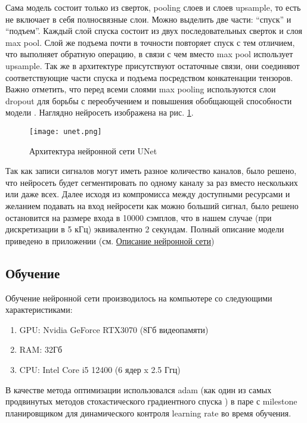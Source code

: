 Сама модель состоит только из сверток, pooling слоев и слоев upsample, то есть
не включает в себя полносвязные слои. Можно выделить две части: ``спуск'' и
``подъем''. Каждый слой спуска состоит из двух последовательных сверток и слоя
max pool. Слой же подъема почти в точности повторяет спуск с тем отличием, что
выполняет обратную операцию, в связи с чем вместо max pool использует upsample.
Так же в архитектуре присутствуют остаточные связи, они соединяют
соответствующие части спуска и подъема посредством конкатенации тензоров. Важно
отметить, что перед всеми слоями max pooling используются слои dropout для
борьбы с переобучением и повышения обобщающей способности модели
\cite{cnn-dropout}. Наглядно нейросеть изображена на рис. \ref{fig:unet}.

\begin{figure}[!htb]
	\centering
	\texttt{[image: unet.png]}
	\caption{Архитектура нейронной сети UNet}
	\label{fig:unet}
\end{figure}

Так как записи сигналов могут иметь разное количество каналов, было решено, что
нейросеть будет сегментировать по одному каналу за раз вместо нескольких или
даже всех. Далее исходя из компромисса между доступными ресурсами и желанием
подавать на вход нейросети как можно больший сигнал, было решено остановится на
размере входа в 10000 сэмплов, что в нашем случае (при дискретизации в 5 кГц)
эквивалентно 2 секундам. Полный описание модели приведено в приложении (см.
\hyperref[lst:unet]{Описание нейронной сети})

\subsection{Обучение}

Обучение нейронной сети производилось на компьютере со следующими характеристиками:

\begin{enumerate}
	\item GPU: Nvidia GeForce RTX3070 (8Гб видеопамяти)
	\item RAM: 32Гб
	\item CPU: Intel Core i5 12400 (6 ядер x 2.5 Ггц)
\end{enumerate}

В качестве метода оптимизации использовался adam (как один из самых продвинутых
методов стохастического градиентного спуска \cite{adam}) в паре с milestone
планировщиком для динамического контроля learning rate во время обучения.

